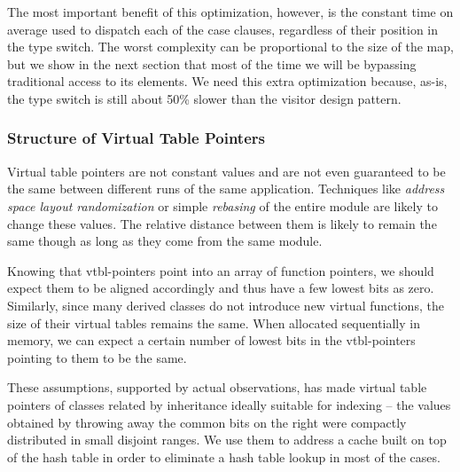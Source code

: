 The most important benefit of this optimization, however, is the constant time 
on average used to dispatch each of the case clauses, regardless of their 
position in the type switch. The worst complexity can be proportional to the 
size of the map, but we show in the next section that most of the time we will 
be bypassing traditional access to its elements. We need this extra 
optimization because, as-is, the type switch is still about 50\% slower than 
the visitor design pattern.


\subsubsection{Structure of Virtual Table Pointers}
\label{sec:sovtp}

Virtual table pointers are not constant values and are not even guaranteed to be 
the same between different runs of the same application. Techniques like 
\emph{address space layout randomization} or simple \emph{rebasing} of the entire 
module are likely to change these values. The relative distance between them is 
likely to remain the same though as long as they come from the same module.

Knowing that vtbl-pointers point into an array of function pointers, we should 
expect them to be aligned accordingly and thus have a few lowest bits as zero. 
Similarly, since many derived classes do not introduce new virtual functions, 
the size of their virtual tables remains the same. When allocated sequentially 
in memory, we can expect a certain number of lowest bits in the vtbl-pointers 
pointing to them to be the same.

These assumptions, supported by actual observations, has made virtual table 
pointers of classes related by inheritance ideally suitable for indexing -- the 
values obtained by throwing away the common bits on the right were compactly 
distributed in small disjoint ranges. We use them to address a cache 
built on top of the hash table in order to eliminate a hash table lookup in most 
of the cases.

